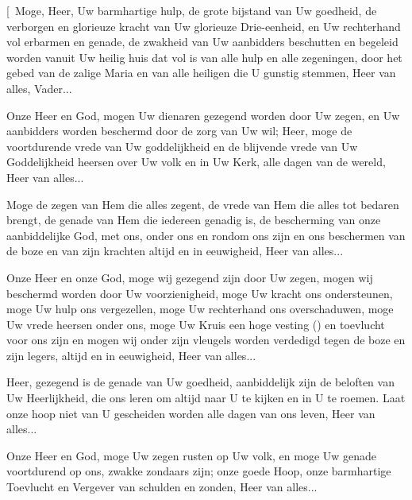 \documentclass[12pt,twoside,a5paper]{article}
\begin{document}



\begin{halfparskip}
  [\cc~Moge, Heer, Uw barmhartige hulp, de grote bijstand van Uw goedheid, de verborgen en glorieuze kracht van Uw glorieuze Drie-eenheid, en Uw rechterhand vol erbarmen en genade, de zwakheid van Uw aanbidders beschutten en begeleid worden vanuit Uw heilig huis dat vol is van alle hulp en alle zegeningen, door het gebed van de zalige Maria en van alle heiligen die U gunstig stemmen, Heer van alles, Vader...

   Onze Heer en God, mogen Uw dienaren gezegend worden door Uw zegen, en Uw aanbidders worden beschermd door de zorg van Uw wil; Heer, moge de voortdurende vrede van Uw goddelijkheid en de blijvende vrede van Uw Goddelijkheid heersen over Uw volk en in Uw Kerk, alle dagen van de wereld, Heer van alles...

   Moge de zegen van Hem die alles zegent, de vrede van Hem die alles tot bedaren brengt, de genade van Hem die iedereen genadig is, de bescherming van onze aanbiddelijke God, met ons, onder ons en rondom ons zijn en ons beschermen van de boze en van zijn krachten altijd en in eeuwigheid, Heer van alles...

   Onze Heer en onze God, moge wij gezegend zijn door Uw zegen, mogen wij beschermd worden door Uw voorzienigheid, moge Uw kracht ons ondersteunen, moge Uw hulp ons vergezellen, moge Uw rechterhand ons overschaduwen, moge Uw vrede heersen onder ons, moge Uw Kruis een hoge vesting () en toevlucht voor ons zijn en mogen wij onder zijn vleugels worden verdedigd tegen de boze en zijn legers, altijd en in eeuwigheid, Heer van alles...

   Heer, gezegend is de genade van Uw goedheid, aanbiddelijk zijn de beloften van Uw Heerlijkheid, die ons leren om altijd naar U te kijken en in U te roemen. Laat onze hoop niet van U gescheiden worden alle dagen van ons leven, Heer van alles...

   Onze Heer en God, moge Uw zegen rusten op Uw volk, en moge Uw genade voortdurend op ons, zwakke zondaars zijn; onze goede Hoop, onze barmhartige Toevlucht en Vergever van schulden en zonden, Heer van alles...


\end{halfparskip}
\end{document}
